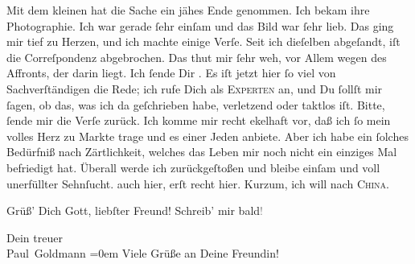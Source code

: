 \pstart
           {\pb}Mit dem kleinen \label{K_L02836-5v}\label{K_L02836-5} hat die Sache ein jähes Ende genommen. Ich bekam ihre Photographie. Ich war
               gerade{ }ſehr einſam und das Bild war{ }ſehr lieb. Das ging mir tief zu Herzen, und ich
               machte einige Verſe. Seit ich dieſelben abgeſandt, iſt die Correſpondenz abgebrochen.
               Das thut mir{ }ſehr weh, \strikeout{\textcolor{gray}{v}} vor Allem wegen des Affronts, der darin liegt. Ich{ }ſende Dir \label{K_L02836-6v}\label{K_L02836-6}. Es iſt jetzt hier{ }ſo viel von
               Sachverſtändigen die Rede; ich rufe Dich als \textsc{Experten} an,
               und Du{ }ſollſt mir{ }ſagen, ob das, was ich da geſchrieben habe, verletzend oder taktlos
               iſt. Bitte,{ }ſende mir die Verſe zurück. Ich komme mir recht ekelhaft vor, daß ich{ }ſo
               mein volles Herz zu Markte trage und es einer Jeden anbiete. Aber ich habe ein{ }ſolches {\pb}Bedürfniß nach Zärtlichkeit, welches das
               Leben mir noch nicht ein einziges Mal befriedigt hat. Überall werde ich
               zurückgeſtoßen und bleibe einſam und voll unerfüllter Sehnſucht. \label{K_L02836-7v}\label{K_L02836-7} auch hier,
               erſt recht hier. Kurzum, ich will nach \textsc{China}.\pend
           
\pstart
           Grüß’ Dich Gott, liebſter Freund! Schreib’ mir bald\textcolor{gray}{!}\pend
           
\pstart
           Dein treuer {\\[\baselineskip]}\spacefill\mbox{Paul Goldmann}\pend
           \leftskip=0em{}
\pstart
           \noindent{}Viele Grüße an Deine Freundin!\pend
           \endnumbering{}  \newcommand{\dateiname}{L02836}\newcommand{\titel}{Paul Goldmann an Arthur Schnitzler, 19. 1. [1898]}\newcommand{\editorInnen}{Martin Anton Müller und Laura Untner}
